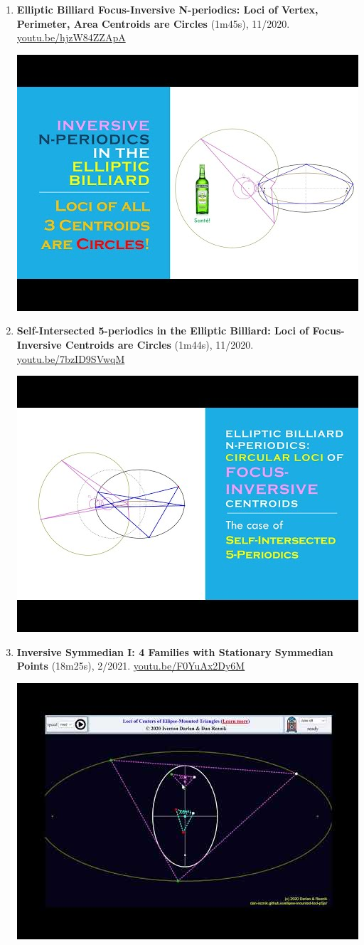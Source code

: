 \documentclass[12pt]{article}
\begin{document}
\begin{enumerate}[resume]
% 
\item \textbf{Elliptic Billiard Focus-Inversive N-periodics: Loci of Vertex, Perimeter, Area Centroids are Circles} (1m45s), 11/2020. \href{https://youtu.be/hjzW84ZZApA}{\url{youtu.be/hjzW84ZZApA}}
\begin{center}\includegraphics[width=.5\textwidth]{pics/hjzW84ZZApA.jpg}\end{center}
% 
\item \textbf{Self-Intersected 5-periodics in the Elliptic Billiard: Loci of Focus-Inversive Centroids are Circles} (1m44s), 11/2020. \href{https://youtu.be/7bzID9SVwqM}{\url{youtu.be/7bzID9SVwqM}}
\begin{center}\includegraphics[width=.5\textwidth]{pics/7bzID9SVwqM.jpg}\end{center}
% 
\item \textbf{Inversive Symmedian I: 4 Families with Stationary Symmedian Points} (18m25s), 2/2021. \href{https://youtu.be/F0YuAx2Dy6M}{\url{youtu.be/F0YuAx2Dy6M}}
\begin{center}\includegraphics[width=.5\textwidth]{pics/F0YuAx2Dy6M.jpg}\end{center}

\end{enumerate}
\end{document}
